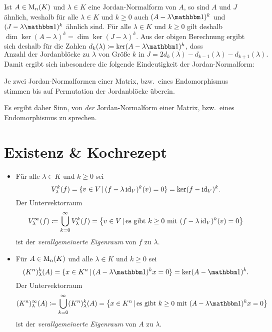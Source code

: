 Ist $A \in \matrices{n}{K}$ und $\lambda \in K$ eine Jordan-Normalform von $A$, so sind $A$ und $J$ ähnlich, weshalb für alle $\lambda \in K$ und $k \geq 0$ auch $(A - \lambda \Id)^k$ und $(J - \lambda \Id)^k$ ähnlich sind.
Für alle $\lambda \in K$ und $k \geq 0$ gilt deshalb $\dim \ker (A - \lambda)^k = \dim \ker (J - \lambda)^k$.
Aus der obigen Berechnung ergibt sich deshalb für die Zahlen $d_k(\lambda) \coloneqq \ker (A - \lambda \Id)^k$, dass
\[
    \text{Anzahl der Jordanblöcke zu $\lambda$ von Größe $k$ in $J$}
  = 2 d_k(\lambda) - d_{k-1}(\lambda) - d_{k+1}(\lambda).
\]
Damit ergibt sich inbesondere die folgende Eindeutigkeit der Jordan-Normalform:

\begin{proposition}
  Je zwei Jordan-Normalformen einer Matrix, bzw.\ eines Endomorphismus stimmen bis auf Permutation der Jordanblöcke überein.
\end{proposition}

Es ergibt daher Sinn, von \emph{der} Jordan-Normalform einer Matrix, bzw.\ eines Endomorphismus zu sprechen.





\section{Existenz \& Kochrezept}

\begin{definition}
  \leavevmode
  \begin{itemize}
    \item
      Für alle $\lambda \in K$ und $k \geq 0$ sei
      \[
          \heigenspace{V}{f}{\lambda}{k}
        = \{ v \in V \suchthat (f - \lambda \id_V)^k(v) = 0 \}
        = \ker (f - \id_V)^k.
      \]
      Der Untervektorraum
      \[
                  \geigenspace{V}{f}{\lambda}
        \coloneqq \bigcup_{k=0}^\infty \heigenspace{V}{f}{\lambda}{k}
        =         \left\{
                    v \in V
                  \suchthat
                    \text{es gibt $k \geq 0$ mit $(f - \lambda \id_V)^k(v) = 0$}
                  \right\}
      \]
      ist der \emph{verallgemeinerte Eigenraum} von $f$ zu $\lambda$.
    \item
      Für $A \in \matrices{n}{K}$ und alle $\lambda \in K$ und $k \geq 0$ sei
      \[
          \heigenspace{(K^n)}{A}{\lambda}{k}
        = \{ x \in K^n \suchthat (A - \lambda \Id)^k x = 0 \}
        = \ker (A - \Id)^k.
      \]
      Der Untervektorraum
      \[
                  \geigenspace{(K^n)}{A}{\lambda}
        \coloneqq \bigcup_{k=0}^\infty \heigenspace{(K^n)}{A}{\lambda}{k}
        =         \left\{
                    x \in K^n
                  \suchthat
                    \text{es gibt $k \geq 0$ mit $(A - \lambda \Id)^k x = 0$}
                  \right\}
      \]
      ist der \emph{verallgemeinerte Eigenraum} von $A$ zu $\lambda$.
  \end{itemize}
\end{definition}

